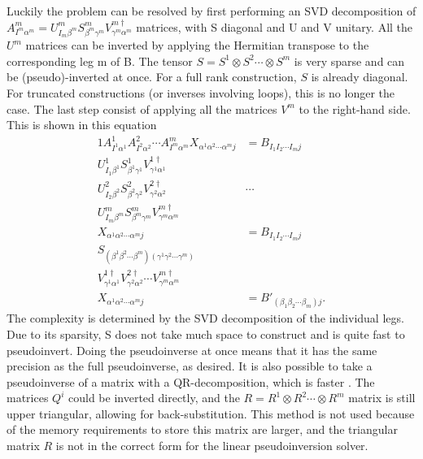 Luckily the problem can be resolved by first performing an \Gls{SVD} decomposition of $A^m_{ I^m \alpha^m } = U^m_{ I_m \beta^m } S^m_{\beta^m \gamma^m}  V^{m\dagger}_{\gamma^m \alpha^m}$ matrices, with S diagonal and U and V unitary. All the $U^m$ matrices can be inverted by applying the Hermitian transpose to the corresponding leg m of B. The tensor $S = S^1 \otimes S^2 \cdots \otimes S^m$ is very sparse and can be (pseudo)-inverted at once. For a full rank construction, $S$  is already diagonal. For truncated constructions (or inverses involving loops), this is no longer the case.
The last step consist of applying all the matrices $V^m$ to the right-hand side. This is shown in this equation
\begin{alignat}{1}
  A^1_{ I^1 \alpha^1 }   A^2_{ I^2 \alpha^2 }  \cdots  A^m_{ I^m \alpha^m }   X_{ \alpha^1  \alpha^2  \cdots \alpha^m j } & =  B_{  I_1  I_2 \cdots I_m   j }                 \\%
  U^1_{ I_1 \beta^1 } S^1_{\beta^1 \gamma^1}  V^{1\dagger}_{\gamma^1 \alpha^1}                                            & \nonumber                                         \\
  U^2_{ I_2 \beta^2 } S^2_{\beta^2 \gamma^2}  V^{2\dagger}_{\gamma^2 \alpha^2}                                            & \cdots  \nonumber                                 \\
  U^m_{ I_m \beta^m } S^m_{\beta^m \gamma^m}  V^{m\dagger}_{\gamma^m \alpha^m}                                            & \nonumber                                         \\
  X_{ \alpha^1  \alpha^2  \cdots \alpha^m j }                                                                             & =  B_{  I_1  I_2 \cdots I_m   j }                 \\ %
  S_{ (\beta^1 \beta^2 \cdots \beta^m) (\gamma^1  \gamma^2 \cdots \gamma^m)  }                                            & \nonumber                                         \\
  V^{1\dagger}_{\gamma^1 \alpha^1}   V^{2\dagger}_{\gamma^2 \alpha^2}  \cdots  V^{m\dagger}_{\gamma^m \alpha^m}           & \nonumber                                         \\
  X_{ \alpha^1  \alpha^2  \cdots \alpha^m j }                                                                             & =  B'_{  (\beta_1  \beta_2 \cdots \beta_m )  j }.
\end{alignat}
The complexity is determined by the \Gls{SVD} decomposition of the individual legs. Due to its sparsity, S does not take much space to construct and is quite fast to pseudoinvert. Doing the pseudoinverse at once means that it has the same precision as the full pseudoinverse, as desired.  It is also possible to take a pseudoinverse of a matrix with a QR-decomposition, which is faster \cite{Moylan2016}. The matrices $Q^i$ could be inverted directly, and the $R = R^1 \otimes R^2 \cdots \otimes R^m$  matrix is still upper triangular, allowing for back-substitution. This method is not used because of the memory requirements to store this matrix are larger, and the triangular matrix $R$ is not in the correct form for the linear pseudoinversion solver.

